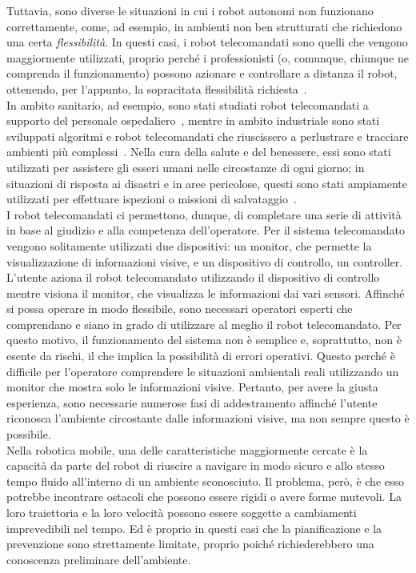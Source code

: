 Tuttavia, sono diverse le situazioni in cui i robot autonomi non funzionano correttamente, come, ad esempio, in ambienti non ben strutturati che richiedono una certa \textit{flessibilità}. In questi casi, i robot telecomandati sono quelli che vengono maggiormente utilizzati, proprio perché i professionisti (o, comunque, chiunque ne comprenda il funzionamento) possono azionare e controllare a distanza il robot, ottenendo, per l'appunto, la sopracitata flessibilità richiesta~\cite{8, 9}.\\ 
In ambito sanitario, ad esempio, sono stati studiati robot telecomandati a supporto del personale ospedaliero~\cite{10, 11}, mentre in ambito industriale sono stati sviluppati algoritmi e robot telecomandati che riuscissero a perlustrare e tracciare ambienti più complessi~\cite{12}. Nella cura della salute e del benessere, essi sono stati utilizzati per assistere gli esseri umani nelle circostanze di ogni giorno; in situazioni di risposta ai disastri e in aree pericolose, questi sono stati ampiamente utilizzati per effettuare ispezioni o missioni di salvataggio~\cite{13, 14}.\\
I robot telecomandati ci permettono, dunque, di completare una serie di attività in base al giudizio e alla competenza dell'operatore. Per il sistema telecomandato vengono solitamente utilizzati due dispositivi: un monitor, che permette la visualizzazione di informazioni visive, e un dispositivo di controllo, un controller. L'utente aziona il robot telecomandato utilizzando il dispositivo di controllo mentre visiona il monitor, che visualizza le informazioni dai vari sensori. Affinché si possa operare in modo flessibile, sono necessari operatori esperti che comprendano e siano in grado di utilizzare al meglio il robot telecomandato. Per questo motivo, il funzionamento del sistema non è semplice e, soprattutto, non è esente da rischi, il che implica la possibilità di errori operativi. Questo perché è difficile per l'operatore comprendere le situazioni ambientali reali utilizzando un monitor che mostra solo le informazioni visive. Pertanto, per avere la giusta esperienza, sono necessarie numerose fasi di addestramento affinché l'utente riconosca l'ambiente circostante dalle informazioni visive, ma non sempre questo è possibile.\\
Nella robotica mobile, una delle caratteristiche maggiormente cercate è la capacità da parte del robot di riuscire a navigare in modo sicuro e allo stesso tempo fluido all'interno di un ambiente sconosciuto. Il problema, però, è che esso potrebbe incontrare ostacoli che possono essere rigidi o avere forme mutevoli. La loro traiettoria e la loro velocità possono essere soggette a cambiamenti imprevedibili nel tempo. Ed è proprio in questi casi che la pianificazione e la prevenzione sono strettamente limitate, proprio poiché richiederebbero una conoscenza preliminare dell'ambiente.\\
